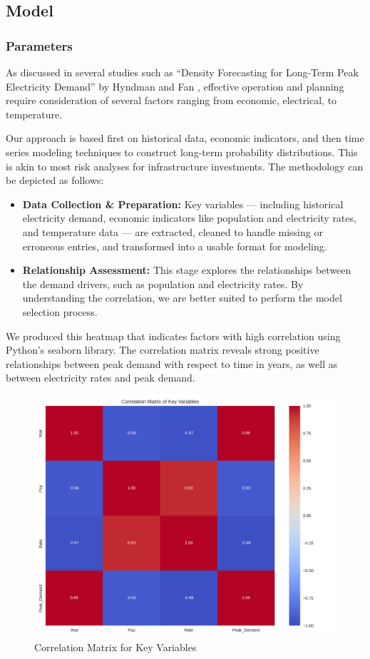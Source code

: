 \documentclass[12pt]{article}
\begin{document}
\subsection{Model}

\subsubsection{Parameters}
As discussed in several studies such as “Density Forecasting for Long-Term Peak Electricity Demand” by Hyndman and Fan \cite{HyndmanFan}, effective operation and planning require consideration of several factors ranging from economic, electrical, to temperature.

Our approach is based first on historical data, economic indicators, and then time series modeling techniques to construct long-term probability distributions. This is akin to most risk analyses for infrastructure investments. The methodology can be depicted as follows:

\begin{itemize}
  \item \textbf{Data Collection \& Preparation:} Key variables — including historical electricity demand, economic indicators like population and electricity rates, and temperature data — are extracted, cleaned to handle missing or erroneous entries, and transformed into a usable format for modeling.
  \item \textbf{Relationship Assessment:} This stage explores the relationships between the demand drivers, such as population and electricity rates. By understanding the correlation, we are better suited to perform the model selection process.
\end{itemize}

We produced this heatmap that indicates factors with high correlation using Python’s seaborn library. The correlation matrix reveals strong positive relationships between peak demand with respect to time in years, as well as between electricity rates and peak demand.

\begin{figure}[H]
  \centering
  \includegraphics[scale=.5]{heatmap.png} 
  \caption{Correlation Matrix for Key Variables}
  \label{fig:correlation_matrix}
\end{figure}
\end{document}

